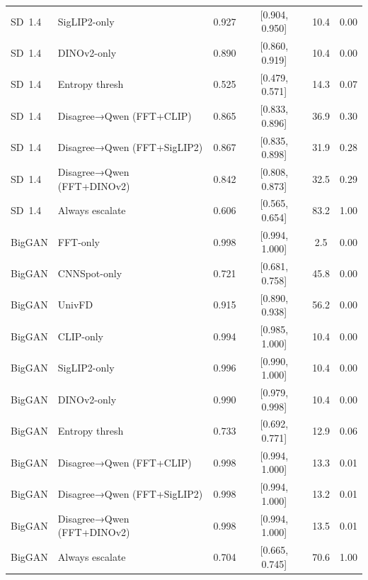 \documentclass{ieeeaccess}
\begin{document}
\begin{table}[t]
\begin{tabular}{llcccc}
SD~1.4 & SigLIP2-only      & 0.927 & [0.904, 0.950] & 10.4  & 0.00 \\
SD~1.4 & DINOv2-only       & 0.890 & [0.860, 0.919] & 10.4  & 0.00 \\
SD~1.4 & Entropy thresh    & 0.525 & [0.479, 0.571] & 14.3  & 0.07 \\
SD~1.4 & Disagree→Qwen (FFT+CLIP)    & 0.865 & [0.833, 0.896] & 36.9  & 0.30 \\
SD~1.4 & Disagree→Qwen (FFT+SigLIP2) & 0.867 & [0.835, 0.898] & 31.9  & 0.28 \\
SD~1.4 & Disagree→Qwen (FFT+DINOv2)  & 0.842 & [0.808, 0.873] & 32.5  & 0.29 \\
SD~1.4 & Always escalate   & 0.606 & [0.565, 0.654] & 83.2  & 1.00 \\
\midrule
BigGAN & FFT-only          & 0.998 & [0.994, 1.000] &  2.5  & 0.00 \\
BigGAN & CNNSpot-only      & 0.721 & [0.681, 0.758] & 45.8  & 0.00 \\
BigGAN & UnivFD            & 0.915 & [0.890, 0.938] & 56.2  & 0.00 \\
BigGAN & CLIP-only         & 0.994 & [0.985, 1.000] & 10.4  & 0.00 \\
BigGAN & SigLIP2-only      & 0.996 & [0.990, 1.000] & 10.4  & 0.00 \\
BigGAN & DINOv2-only       & 0.990 & [0.979, 0.998] & 10.4  & 0.00 \\
BigGAN & Entropy thresh    & 0.733 & [0.692, 0.771] & 12.9  & 0.06 \\
BigGAN & Disagree→Qwen (FFT+CLIP)    & 0.998 & [0.994, 1.000] & 13.3  & 0.01 \\
BigGAN & Disagree→Qwen (FFT+SigLIP2) & 0.998 & [0.994, 1.000] & 13.2  & 0.01 \\
BigGAN & Disagree→Qwen (FFT+DINOv2)  & 0.998 & [0.994, 1.000] & 13.5  & 0.01 \\
BigGAN & Always escalate   & 0.704 & [0.665, 0.745] & 70.6  & 1.00 \\
\bottomrule
\end{tabular}
\end{table}
\end{document}
